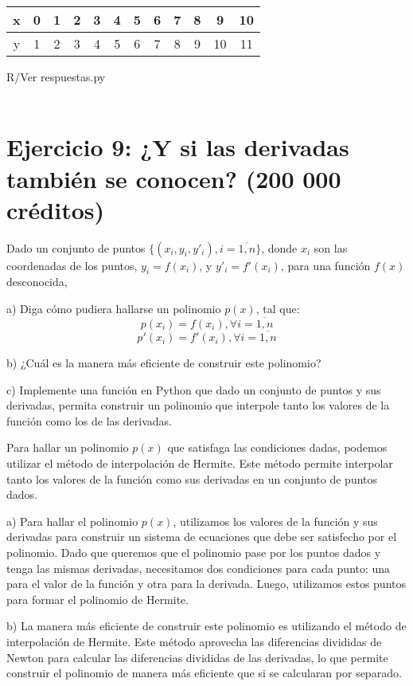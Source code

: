 \documentclass[a4paper,12pt]{article}
\begin{document}
\begin{table}[h]
\centering
\begin{tabular}{|c|c|c|c|c|c|c|c|c|c|c|c|}
\hline
x & 0 & 1 & 2 & 3 & 4 & 5 & 6 & 7 & 8 & 9 & 10 \\
\hline
y & 1 & 2 & 3 & 4 & 5 & 6 & 7 & 8 & 9 & 10 & 11 \\
\hline
\end{tabular}
\end{table}

R/Ver respuestas.py\\\\

\section*{Ejercicio 9: ¿Y si las derivadas también se conocen? (200 000 créditos)}

Dado un conjunto de puntos $\{(x_i, y_i, y'_i), i = \overline{ 1, n}\}$, donde $x_i$ son las coordenadas de los puntos, $y_i = f(x_i)$, y $y'_i = f'(x_i)$, para una función $f(x)$ desconocida,

a) Diga cómo pudiera hallarse un polinomio $p(x)$, tal que:
\[ p(x_i) = f(x_i), \forall i =\overline{ 1, n} \]
\[ p'(x_i) = f'(x_i), \forall i = \overline{ 1, n} \]

b) ¿Cuál es la manera más eficiente de construir este polinomio?

c) Implemente una función en Python que dado un conjunto de puntos y sus derivadas, permita construir un polinomio que interpole tanto los valores de la función como los de las derivadas.

Para hallar un polinomio \( p(x) \) que satisfaga las condiciones dadas, podemos utilizar el método de interpolación de Hermite. Este método permite interpolar tanto los valores de la función como sus derivadas en un conjunto de puntos dados.

a) Para hallar el polinomio \( p(x) \), utilizamos los valores de la función y sus derivadas para construir un sistema de ecuaciones que debe ser satisfecho por el polinomio. Dado que queremos que el polinomio pase por los puntos dados y tenga las mismas derivadas, necesitamos dos condiciones para cada punto: una para el valor de la función y otra para la derivada. Luego, utilizamos estos puntos para formar el polinomio de Hermite.

b) La manera más eficiente de construir este polinomio es utilizando el método de interpolación de Hermite. Este método aprovecha las diferencias divididas de Newton para calcular las diferencias divididas de las derivadas, lo que permite construir el polinomio de manera más eficiente que si se calcularan por separado.
\end{document}
